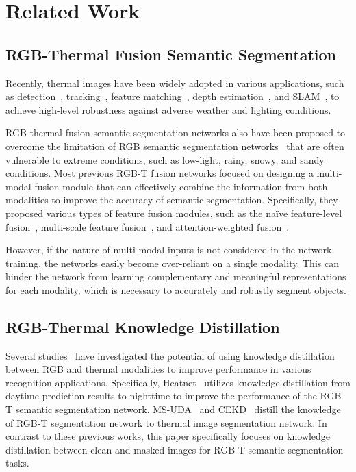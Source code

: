 \documentclass[10pt,twocolumn,letterpaper]{article}
\begin{document}
  \section{Related Work}
\label{sec:related}

\subsection{RGB-Thermal Fusion Semantic Segmentation}
Recently, thermal images have been widely adopted in various applications, such as detection~\cite{lee2022sequential,yang2022baanet}, tracking~\cite{li2019rgb,kang2022robust}, feature matching~\cite{lee2023edge, 9359356}, depth estimation~\cite{shin2021self,shin2022maximizing,shin2023self}, and SLAM~\cite{shin2019sparse,khattak2020keyframe}, to achieve high-level robustness against adverse weather and lighting conditions.

RGB-thermal fusion semantic segmentation networks also have been proposed to overcome the limitation of RGB semantic segmentation networks~\cite{chen2017deeplab,he2017mask,wang2020deep,cheng2021maskformer,cheng2022masked} that are often vulnerable to extreme conditions, such as low-light, rainy, snowy, and sandy conditions.
Most previous RGB-T fusion networks focused on designing a multi-modal fusion module that can effectively combine the information from both modalities to improve the accuracy of semantic segmentation.
Specifically, they proposed various types of feature fusion modules, such as the na\"ive feature-level fusion~\cite{ha2017mfnet,sun2019rtfnet,shivakumar2019pst900}, multi-scale feature fusion~\cite{sun2019rtfnet,zhang2021abmdrnet,sun2020fuseseg,liu2022cmx}, and attention-weighted fusion~\cite{xu2021attention, zhang2021abmdrnet, deng2021feanet, liu2022cmx}.

However, if the nature of multi-modal inputs is not considered in the network training, the networks easily become over-reliant on a single modality.
This can hinder the network from learning complementary and meaningful representations for each modality, which is necessary to accurately and robustly segment objects.


\subsection{RGB-Thermal Knowledge Distillation} 
Several studies~\cite{vertens2020heatnet,kim2021ms,feng2023cekd} have investigated the potential of using knowledge distillation between RGB and thermal modalities to improve performance in various recognition applications.
Specifically, Heatnet~\cite{vertens2020heatnet} utilizes knowledge distillation from daytime prediction results to nighttime to improve the performance of the RGB-T semantic segmentation network. 
MS-UDA~\cite{kim2021ms} and CEKD~\cite{feng2023cekd} distill the knowledge of RGB-T segmentation network to thermal image segmentation network.
In contrast to these previous works, this paper specifically focuses on knowledge distillation between clean and masked images for RGB-T semantic segmentation tasks.
\end{document}
